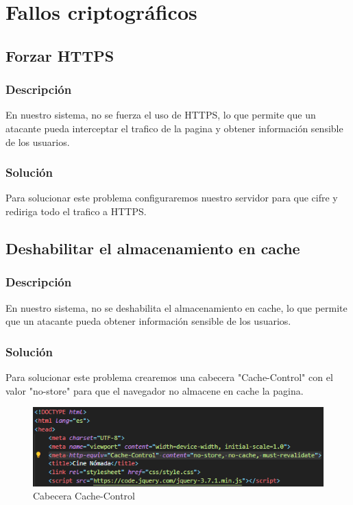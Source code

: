 \documentclass{report}
\begin{document}
        \clearpage
        \section{Fallos criptográficos}
            \subsection{Forzar HTTPS}
                \subsubsection{Descripción}
                    En nuestro sistema, no se fuerza el uso de HTTPS, lo que permite que un atacante pueda interceptar el trafico de la pagina y obtener información sensible de los usuarios.
                \subsubsection{Solución}
                    Para solucionar este problema configuraremos nuestro servidor para que cifre y rediriga todo el trafico a HTTPS.
            \subsection{Deshabilitar el almacenamiento en cache}
                \subsubsection{Descripción}
                    En nuestro sistema, no se deshabilita el almacenamiento en cache, lo que permite que un atacante pueda obtener información sensible de los usuarios.
                \subsubsection{Solución}
                    Para solucionar este problema crearemos una cabecera "Cache-Control" con el valor "no-store" para que el navegador no almacene en cache la pagina.
                    \begin{figure}[H]
                        \centering
                        \includegraphics[width=\textwidth]{./img/vulnerabilidades/3.2.2.1.png}
                        \caption{Cabecera Cache-Control}
                    \end{figure}
\end{document}
